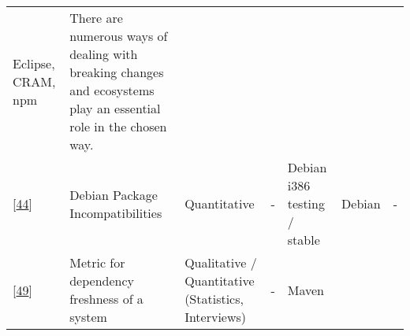 \documentclass[]{book}
\begin{document}
\begin{longtable}[]{@{}lllllll@{}}
\begin{minipage}[t]{0.12\columnwidth}
Eclipse, CRAM, npm\strut
\end{minipage} & \begin{minipage}[t]{0.10\columnwidth}\raggedright\strut
There are numerous ways of dealing with breaking changes and ecosystems
play an essential role in the chosen way.\strut
\end{minipage}\tabularnewline
\begin{minipage}[t]{0.09\columnwidth}\raggedright\strut
{[}\protect\hyperlink{ref-Claes2015}{44}{]}\strut
\end{minipage} & \begin{minipage}[t]{0.16\columnwidth}\raggedright\strut
Debian Package Incompatibilities\strut
\end{minipage} & \begin{minipage}[t]{0.17\columnwidth}\raggedright\strut
Quantitative\strut
\end{minipage} & \begin{minipage}[t]{0.07\columnwidth}\raggedright\strut
-\strut
\end{minipage} & \begin{minipage}[t]{0.10\columnwidth}\raggedright\strut
Debian i386 testing / stable\strut
\end{minipage} & \begin{minipage}[t]{0.12\columnwidth}\raggedright\strut
Debian\strut
\end{minipage} & \begin{minipage}[t]{0.10\columnwidth}\raggedright\strut
-\strut
\end{minipage}\tabularnewline
\begin{minipage}[t]{0.09\columnwidth}\raggedright\strut
{[}\protect\hyperlink{ref-Cox2015}{49}{]}\strut
\end{minipage} & \begin{minipage}[t]{0.16\columnwidth}\raggedright\strut
Metric for dependency freshness of a system\strut
\end{minipage} & \begin{minipage}[t]{0.17\columnwidth}\raggedright\strut
Qualitative / Quantitative (Statistics, Interviews)\strut
\end{minipage} & \begin{minipage}[t]{0.07\columnwidth}\raggedright\strut
-\strut
\end{minipage} & \begin{minipage}[t]{0.10\columnwidth}\raggedright\strut
Maven\strut
\end{minipage} & \begin{minipage}[t]{0.12\columnwidth}\raggedright\strut

\end{minipage}
\end{longtable}
\end{document}
